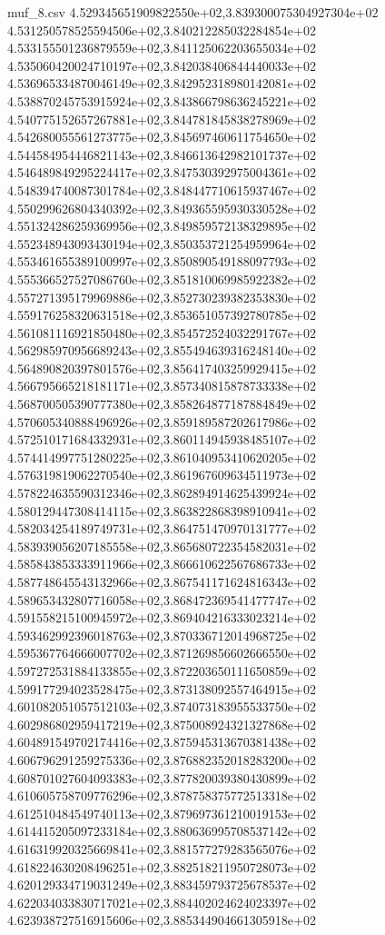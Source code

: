 \begin{filecontents*}{muf_8.csv}
4.529345651909822550e+02,3.839300075304927304e+02
4.531250578525594506e+02,3.840212285032284854e+02
4.533155501236879559e+02,3.841125062203655034e+02
4.535060420024710197e+02,3.842038406844440033e+02
4.536965334870046149e+02,3.842952318980142081e+02
4.538870245753915924e+02,3.843866798636245221e+02
4.540775152657267881e+02,3.844781845838278969e+02
4.542680055561273775e+02,3.845697460611754650e+02
4.544584954446821143e+02,3.846613642982101737e+02
4.546489849295224417e+02,3.847530392975004361e+02
4.548394740087301784e+02,3.848447710615937467e+02
4.550299626804340392e+02,3.849365595930330528e+02
4.551324286259369956e+02,3.849859572138329895e+02
4.552348943093430194e+02,3.850353721254959964e+02
4.553461655389100997e+02,3.850890549188097793e+02
4.555366527527086760e+02,3.851810069985922382e+02
4.557271395179969886e+02,3.852730239382353830e+02
4.559176258320631518e+02,3.853651057392780785e+02
4.561081116921850480e+02,3.854572524032291767e+02
4.562985970956689243e+02,3.855494639316248140e+02
4.564890820397801576e+02,3.856417403259929415e+02
4.566795665218181171e+02,3.857340815878733338e+02
4.568700505390777380e+02,3.858264877187884849e+02
4.570605340888496926e+02,3.859189587202617986e+02
4.572510171684332931e+02,3.860114945938485107e+02
4.574414997751280225e+02,3.861040953410620205e+02
4.576319819062270540e+02,3.861967609634511973e+02
4.578224635590312346e+02,3.862894914625439924e+02
4.580129447308414115e+02,3.863822868398910941e+02
4.582034254189749731e+02,3.864751470970131777e+02
4.583939056207185558e+02,3.865680722354582031e+02
4.585843853333911966e+02,3.866610622567686733e+02
4.587748645543132966e+02,3.867541171624816343e+02
4.589653432807716058e+02,3.868472369541477747e+02
4.591558215100945972e+02,3.869404216333023214e+02
4.593462992396018763e+02,3.870336712014968725e+02
4.595367764666007702e+02,3.871269856602666550e+02
4.597272531884133855e+02,3.872203650111650859e+02
4.599177294023528475e+02,3.873138092557464915e+02
4.601082051057512103e+02,3.874073183955533750e+02
4.602986802959417219e+02,3.875008924321327868e+02
4.604891549702174416e+02,3.875945313670381438e+02
4.606796291259275336e+02,3.876882352018283200e+02
4.608701027604093383e+02,3.877820039380430899e+02
4.610605758709776296e+02,3.878758375772513318e+02
4.612510484549740113e+02,3.879697361210019153e+02
4.614415205097233184e+02,3.880636995708537142e+02
4.616319920325669841e+02,3.881577279283565076e+02
4.618224630208496251e+02,3.882518211950728073e+02
4.620129334719031249e+02,3.883459793725678537e+02
4.622034033830717021e+02,3.884402024624023397e+02
4.623938727516915606e+02,3.885344904661305918e+02

\end{filecontents*}
